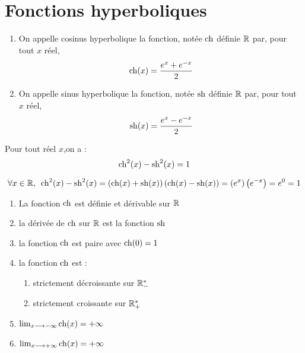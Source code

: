 \section{Fonctions hyperboliques}
\begin{defprop}
    \begin{enumerate}
        \item On appelle cosinus hyperbolique la fonction, notée \(\operatorname{ch}\) définie \(\mathbb{R}\) par, pour tout \(x\) réel, 
        \[\operatorname{ch}(x) = \frac{e^x+e^{-x}}{2}\]
        \item On appelle sinus hyperbolique la fonction, notée \(\operatorname{sh}\) définie \(\mathbb{R}\) par, pour tout \(x\) réel, 
        \[\operatorname{sh}(x) = \frac{e^x-e^{-x}}{2}\]
    \end{enumerate}
\end{defprop}

\begin{defprop}
    Pour tout réel \(x\),on a : \[\operatorname{ch}^2(x)-\operatorname{sh}^2(x) = 1\]
\end{defprop}

\begin{dem}
\[\quantifs{\forall x \in \R} \ch^2(x)-\sh^2(x) = \paren{\ch(x)+\sh(x)}\paren{\ch(x)-\sh(x)} = \paren{e^x}\paren{e^{-x}} = e^0 = 1 \]
\end{dem}

\begin{defprop}
    \begin{enumerate}
        \item La fonction \(\operatorname{ch}\) est définie et dérivable sur \(\mathbb{R}\)
        \item la dérivée de \(\operatorname{ch}\) sur \(\mathbb{R}\) est la fonction \(\operatorname{sh}\)
        \item la fonction \(\operatorname{ch}\) est paire avec \(\operatorname{ch}(0) =1\)
        \item la fonction \(\operatorname{ch}\) est : 
        \begin{enumerate}
            \item strictement décroissante sur \(\mathbb{R}_-^*\)
            \item strictement croissante sur \(\mathbb{R}_+^*\)
        \end{enumerate}
        \item \(\lim_{x\longrightarrow-\infty} \operatorname{ch}(x) = +\infty \)
        \item \(\lim_{x\longrightarrow+\infty} \operatorname{ch}(x) = +\infty \)
    \end{enumerate}    
\end{defprop}

